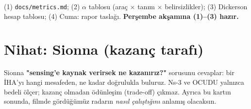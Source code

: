 \documentclass[10.5pt,a4paper]{article}
\begin{document}
\begin{teslim}
(1) \texttt{docs/metrics.md}; (2) $\alpha$ tablosu (araç $\times$ tanım $\times$ belirsizlikler); (3) Dickerson hesap tablosu; (4) Cuma: rapor taslağı. \textbf{Perşembe akşamına (1)--(3) hazır.}
\end{teslim}

\clearpage
\section*{Nihat: Sionna (kazanç tarafı)}
\begin{neden}
Sionna \textbf{"sensing'e kaynak verirsek ne kazanırız?"} sorusunu cevaplar: bir İHA'yı hangi mesafeden, ne kadar doğrulukla buluruz. Ns-3 ve OCUDU yalnızca bedeli ölçer; kazanç olmadan ödünleşim (trade-off) çıkmaz. Ayrıca bu kartın sonunda, filmde gördüğümüz radarın \emph{nasıl çalıştığını} anlamış olacaksın.
\end{neden}
\end{document}
